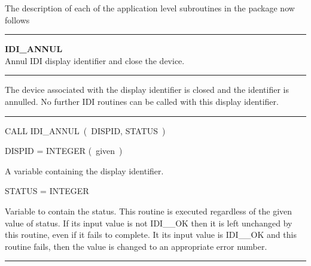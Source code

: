 The description of each of the application level subroutines in the package
now follows

\vspace{10mm}
\parbox{160mm}{

\rule{160mm}{0.5mm}

\hspace*{10mm}\parbox{140mm}{
{\bf IDI\_ANNUL\label{IDI_ANNUL}} \\
Annul IDI display identifier and close the device.}

\rule{160mm}{0.1mm}

\hspace*{10mm}\parbox{140mm}{
The device associated with the display identifier is closed and the
identifier is annulled. No further IDI routines can be called with this
display identifier.}

\rule{160mm}{0.1mm}

\hspace*{10mm}\parbox{140mm}{
CALL IDI\_ANNUL~(~DISPID, STATUS~)}

\hspace*{10mm}\parbox{140mm}{
DISPID = INTEGER \hspace{10mm} (~given~)}

\hspace*{30mm}\parbox{120mm}{
A variable containing the display identifier.}

\hspace*{10mm}\parbox{140mm}{
STATUS = INTEGER}

\hspace*{30mm}\parbox{120mm}{
Variable to contain the status. This routine is executed regardless of the
given value of status. If its input value is not IDI\_\_OK then it is left
unchanged by this routine, even if it fails to complete. It its input value
is IDI\_\_OK and this routine fails, then the value is changed to an
appropriate error number.}

\rule{160mm}{0.5mm}
}

